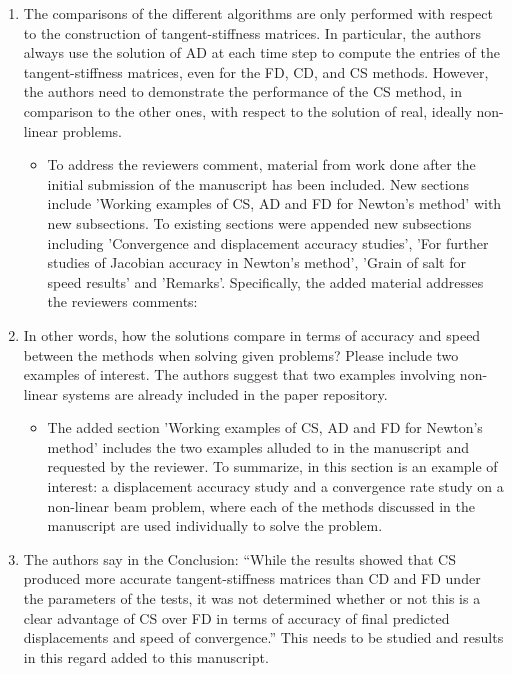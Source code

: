 \documentclass{article}
\begin{document}
\begin{enumerate}
  \item
      The comparisons of the different algorithms are only performed with respect to the
      construction of tangent-stiffness matrices. In particular, the authors always use the
      solution of AD at each time step to compute the entries of the tangent-stiffness
      matrices, even for the FD, CD, and CS methods. However, the authors need to
      demonstrate the performance of the CS method, in comparison to the other ones,
      with respect to the solution of real, ideally non-linear problems. 

{\color{red}
  \begin{itemize}
    \item 
        To address the reviewers comment, material from work done after the
        initial submission of the manuscript has been included. New sections
        include 'Working examples of CS, AD and FD for Newton's method' with
        new subsections. To existing sections were appended new subsections
        including 'Convergence and displacement accuracy studies', 'For further
        studies of Jacobian accuracy in Newton's method', 'Grain of salt for
        speed results' and 'Remarks'. Specifically, the added material addresses
        the reviewers comments:
    \end{itemize}}

\item 
      In other words, how the solutions compare in terms of accuracy and speed between the methods when
      solving given problems? Please include two examples of interest. The authors
      suggest that two examples involving non-linear systems are already included in the
      paper repository.

{\color{red}
  \begin{itemize}
    \item 
        The added section 'Working examples of CS, AD and FD for Newton's method' includes
        the two examples alluded to in the manuscript and requested by the reviewer. 
        To summarize, in this section is an example of interest: a displacement accuracy study and 
        a convergence rate study on a non-linear beam problem, where each of the methods
        discussed in the manuscript are used individually to solve the problem. 
 \end{itemize}}

\item
      The authors say in the Conclusion: “While the results showed that CS
      produced more accurate tangent-stiffness matrices than CD and FD under
      the parameters of the tests, it was not determined whether or not this is
      a clear advantage of CS over FD in terms of accuracy of final predicted
      displacements and speed of convergence.” This needs to be studied and
      results in this regard added to this manuscript.


\end{enumerate}
\end{document}
